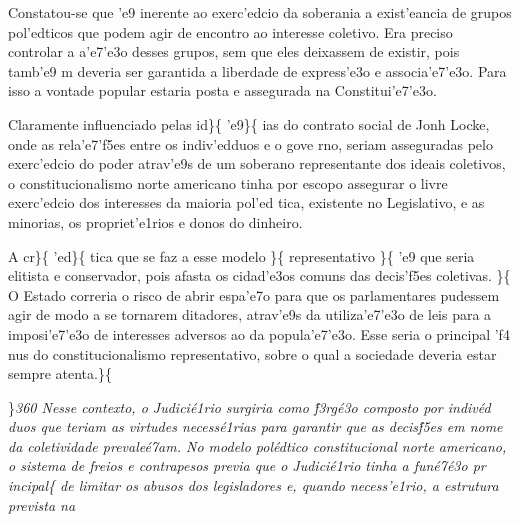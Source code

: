 Constatou-se que 'e9 inerente ao exerc'edcio da soberania a exist'eancia
de grupos pol'edticos que podem agir de encontro ao interesse coletivo.
Era preciso controlar a a'e7'e3o desses grupos, sem que eles deixassem
de existir, pois tamb'e9 m deveria ser garantida a liberdade de
express'e3o e associa'e7'e3o. Para isso a vontade popular estaria posta
e assegurada na Constitui'e7'e3o. \par Claramente influenciado pelas
id\}\{\rtlch{}  \ltrch{}  'e9\}\{\rtlch{}
 \ltrch{}  ias do contrato social
de Jonh Locke, onde as rela'e7'f5es entre os indiv'edduos e o gove rno,
seriam asseguradas pelo exerc'edcio do poder atrav'e9s de um soberano
representante dos ideais coletivos, o constitucionalismo norte americano
tinha por escopo assegurar o livre exerc'edcio dos interesses da maioria
pol'ed tica, existente no Legislativo, e as minorias, os propriet'e1rios
e donos do dinheiro. \par A cr\}\{\rtlch{}  \ltrch{}
 'ed\}\{\rtlch{}  \ltrch{}
 tica que se faz a esse modelo
\}\{\rtlch{}  \ltrch{}  representativo
\}\{\rtlch{}  \ltrch{}  'e9
que seria elitista e conservador, pois afasta os cidad'e3os comuns das
decis'f5es coletivas. \}\{\rtlch{}  \ltrch{}  O
Estado correria o risco de abrir espa'e7o para que os parlamentares
pudessem agir de modo a se tornarem ditadores, atrav'e9s da
utiliza'e7'e3o de leis para a imposi'e7'e3o de interesses adversos ao da
popula'e7'e3o. Esse seria o principal 'f4 nus do constitucionalismo
representativo, sobre o qual a sociedade deveria estar sempre
atenta.\}\{\rtlch{}  \ltrch{} \\
\par \}\pard \ltrpar\qj {}\sl360\widctlpar\wrapdefault\faauto{} {\rtlch{}  \ltrch{}  Nesse contexto, o Judici\'e1rio surgiria como \'f3rg\'e3o composto por indiv\'ed
duos que teriam as virtudes necess\'e1rias para garantir que as decis\'f5es em nome da coletividade prevale\'e7am. No modelo pol\'edtico constitucional norte americano, o sistema de freios e contrapesos previa que o Judici\'e1rio tinha a fun\'e7\'e3o pr}{
\rtlch{}  \ltrch{}  incipal}\{\rtlch{} 
\ltrch{}  de limitar os abusos dos
legisladores e, quando necess'e1rio, a estrutura prevista na
